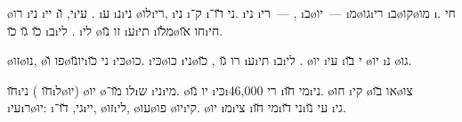 
\o{רו} \i{ני} \i{יי} \i{י}, \u{ו}\i{עי}  . \i{ע}  \i{נ}\i{ני} \o{לו}\i{רי}, \i{ני} \i{ק}־ \i{ני} \u{רו}־. \i{ני} \i{רי}~— , \i{ב}\o{יו}~— \i{מ}\o{גו}\i{רי} \i{ב}\o{קו}\o{מו} \i{חי}   . \u{כו} \u{גו} \u{כו} \i{ב}\i{לי} . \i{לי} \o{זו} \u{נו} \i{ע}\i{תי} \i{מ}\u{לו}\o{חו} \u{או}\i{חי}.



\o{זו}\o{נו}, \o{פו} \u{ו}\o{יו}\u{נו}\i{ני}  \u{כו} \i{כּי}\o{כו}. \i{כּי}\o{כו} \i{ני}\o{רו} \u{גו} , \u{כו} \i{ע}\i{תי} \i{ב}\i{לי}  .   \o{יו} \i{עי} \i{י}  \u{בו} \o{יו} \i{נ} \o{גו}.



\u{חו}\i{ני} ( \u{חו}\i{ל}\o{יו})  \o{יו} \o{לו} \u{מו}־\i{ש}  \i{ני}\i{מי}. \o{יו} \u{נו} \i{כּי}\i{רי}  46,000 \i{מי} \u{חו}\i{ני}. \o{חו}  \i{קי} \o{או}  \u{בו}\o{צו} \i{עי}\i{ר}\o{יו}: \i{גי}, \u{דו}־\i{יי}, \o{זו}\i{לי}, \o{עו}\o{פו} \o{יו}\i{קי}. \o{יו} \i{מ}\i{צי} \i{מי} \u{חו}\i{ני} \u{דו}\i{עי} \u{נו}  \i{גי}.



